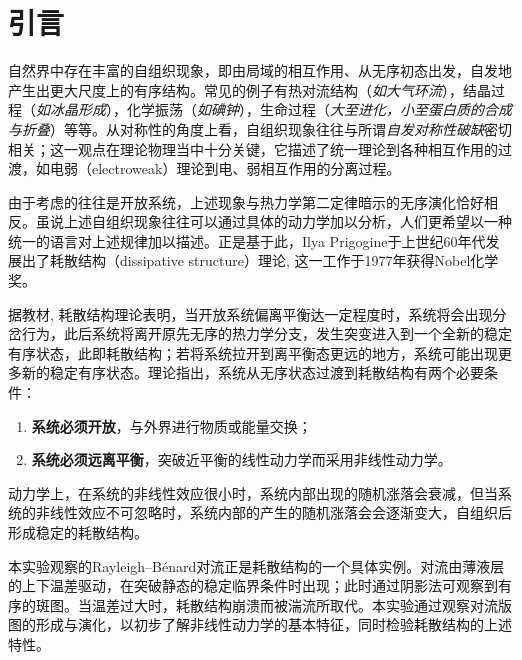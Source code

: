 \documentclass[a4paper]{article}
\begin{document}
\newpage
\begin{center}
\tableofcontents\label{c}
\end{center}
\newpage

\section{引言} \label{overview}%
自然界中存在丰富的自组织现象，即由局域的相互作用、从无序初态出发，自发地产生出更大尺度上的有序结构。常见的例子有热对流结构（\textit{如大气环流}），结晶过程（\textit{如冰晶形成}），化学振荡（\textit{如碘钟}），生命过程（\textit{大至进化，小至蛋白质的合成与折叠}）等等。从对称性的角度上看，自组织现象往往与所谓\mbox{\textit{自发对称性破缺}}密切相关；这一观点在理论物理当中十分关键，它描述了统一理论到各种相互作用的过渡，如电弱（electroweak）理论到电、弱相互作用的分离过程。
	
由于考虑的往往是开放系统，上述现象与热力学第二定律暗示的无序演化恰好相反。虽说上述自组织现象往往可以通过具体的动力学加以分析，人们更希望以一种统一的语言对上述规律加以描述。正是基于此，Ilya Prigogine于上世纪60年代发展出了耗散结构（dissipative structure）理论, 这一工作于1977年获得Nobel化学奖。

据教材, 耗散结构理论表明，当开放系统偏离平衡达一定程度时，系统将会出现分岔行为，此后系统将离开原先无序的热力学分支，发生突变进入到一个全新的稳定有序状态，此即耗散结构；若将系统拉开到离平衡态更远的地方，系统可能出现更多新的稳定有序状态。理论指出，系统从无序状态过渡到耗散结构有两个必要条件：
\begin{enumerate}[1.]
\item \textbf{系统必须开放}，与外界进行物质或能量交换；
\item \textbf{系统必须远离平衡}，突破近平衡的线性动力学而采用非线性动力学。
\end{enumerate}

动力学上，在系统的非线性效应很小时，系统内部出现的随机涨落会衰减，但当系统的非线性效应不可忽略时，系统内部的产生的随机涨落会会逐渐变大，自组织后形成稳定的耗散结构。
	
本实验观察的Rayleigh–Bénard对流正是耗散结构的一个具体实例。对流由薄液层的上下温差驱动，在突破静态的稳定临界条件时出现；此时通过阴影法可观察到有序的斑图。当温差过大时，耗散结构崩溃而被湍流所取代。本实验通过观察对流版图的形成与演化，以初步了解非线性动力学的基本特征，同时检验耗散结构的上述特性。
\end{document}
